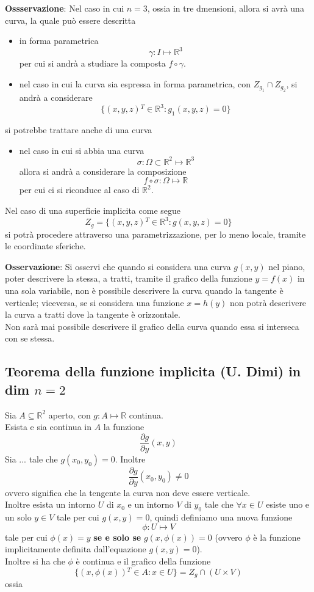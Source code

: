 \documentclass[a4paper]{extarticle}
\begin{document}
\vspace{1em}
\noindent
\textbf{Ossservazione}: Nel caso in cui $n=3$, ossia in tre dmensioni, allora si avrà una curva, la quale può essere descritta
\begin{itemize}
    \item in forma parametrica
    \[\gamma : I \longmapsto \mathbb{R}^3\]
    per cui si andrà a studiare la composta $f \circ \gamma$.

    \item nel caso in cui la curva sia espressa in forma parametrica, con $Z_{g_1} \cap Z_{g_2}$, si andrà a considerare
    \[\{(x,y,z){^T} \in \mathbb{R}^3 : g_1(x,y,z) = 0\}\]
\end{itemize}
si potrebbe trattare anche di una curva
\begin{itemize}
    \item nel caso in cui si abbia una curva \[\sigma : \Omega \subset \mathbb{R}^2 \longmapsto \mathbb{R}^3\]
    allora si andrà a considerare la composizione
    \[f \circ \sigma : \Omega \longmapsto \mathbb{R}\]
    per cui ci si riconduce al caso di $\mathbb{R}^2$.
\end{itemize}
Nel caso di una superficie implicita come segue
\[Z_g = \{(x,y,z){^T} \in \mathbb{R}^3 : g(x,y,z) = 0\}\]
si potrà procedere attraverso una parametrizzazione, per lo meno locale, tramite le coordinate sferiche.

\vspace{2em}
\noindent
\textbf{Osservazione}: Si osservi che quando si considera una curva $g(x,y)$ nel piano, poter descrivere la stessa, a tratti, tramite il grafico della funzione $y=f(x)$ in una sola variabile, non è possibile descrivere la curva quando la tangente è verticale; viceversa, se si considera una funzione $x=h(y)$ non potrà descrivere la curva a tratti dove la tangente è orizzontale.\\
Non sarà mai possibile descrivere il grafico della curva quando essa si interseca con se stessa.

\vspace{1em}
\subsection{Teorema della funzione implicita (U. Dimi) in dim $n=2$}
Sia $A \subseteq \mathbb{R}^2$ aperto, con $g : A \longmapsto \mathbb{R}$ continua.\\
Esista e sia continua in $A$ la funzione
\[\dfrac{\partial g}{\partial y} (x,y)\]
Sia ... tale che $g(x_0,y_0) = 0$. Inoltre
\[\dfrac{\partial g}{\partial y}(x_0,y_0) \neq 0\]
ovvero significa che la tengente la curva non deve essere verticale.\\
Inoltre esista un intorno $U$ di $x_0$ e un intorno $V$ di $y_0$ tale che $\forall x \in U$ esiste uno e un solo $y \in V$ tale per cui $g(x,y)=0$, quindi definiamo una nuova funzione
\[\phi : U \longmapsto V\]
tale per cui $\phi(x) = y$ \textbf{se e solo se} $g(x,\phi(x)) = 0$ (ovvero $\phi$ è la funzione implicitamente definita dall'equazione $g(x,y) = 0$).\\
Inoltre si ha che $\phi$ è continua e il grafico della funzione
\[\{(x,\phi(x)){^T} \in A : x \in U\} = Z_g \cap (U \times V)\]
ossia 
\end{document}
